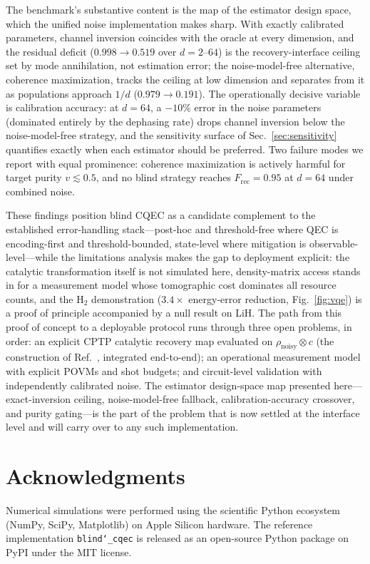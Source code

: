 \documentclass[a4paper,onecolumn]{quantumarticle}
\newcommand{\Frec}{F_\mathrm{rec}}
\newcommand{\rhon}{\rho_\mathrm{noisy}}
\begin{document}
The benchmark's substantive content is the map of the estimator design space, which the unified noise implementation makes sharp.
With exactly calibrated parameters, channel inversion coincides with the oracle at every dimension, and the residual deficit ($0.998 \to 0.519$ over $d = 2$--$64$) is the recovery-interface ceiling set by mode annihilation, not estimation error; the noise-model-free alternative, coherence maximization, tracks the ceiling at low dimension and separates from it as populations approach $1/d$ ($0.979 \to 0.191$).
The operationally decisive variable is calibration accuracy: at $d = 64$, a $-10\%$ error in the noise parameters (dominated entirely by the dephasing rate) drops channel inversion below the noise-model-free strategy, and the sensitivity surface of Sec.~\ref{sec:sensitivity} quantifies exactly when each estimator should be preferred.
Two failure modes we report with equal prominence: coherence maximization is actively harmful for target purity $v \lesssim 0.5$, and no blind strategy reaches $\Frec = 0.95$ at $d = 64$ under combined noise.

These findings position blind CQEC as a candidate complement to the established error-handling stack---post-hoc and threshold-free where QEC is encoding-first and threshold-bounded, state-level where mitigation is observable-level---while the limitations analysis makes the gap to deployment explicit: the catalytic transformation itself is not simulated here, density-matrix access stands in for a measurement model whose tomographic cost dominates all resource counts, and the H$_2$ demonstration ($3.4\times$ energy-error reduction, Fig.~\ref{fig:vqe}) is a proof of principle accompanied by a null result on LiH.
The path from this proof of concept to a deployable protocol runs through three open problems, in order: an explicit CPTP catalytic recovery map evaluated on $\rhon \otimes c$ (the construction of Ref.~\cite{Wakaura2026unified}, integrated end-to-end); an operational measurement model with explicit POVMs and shot budgets; and circuit-level validation with independently calibrated noise.
The estimator design-space map presented here---exact-inversion ceiling, noise-model-free fallback, calibration-accuracy crossover, and purity gating---is the part of the problem that is now settled at the interface level and will carry over to any such implementation.


\section*{Acknowledgments}
Numerical simulations were performed using the scientific Python ecosystem (NumPy, SciPy, Matplotlib) on Apple Silicon hardware.
The reference implementation \texttt{blind\char`\_cqec} is released as an open-source Python package on PyPI under the MIT license.
\end{document}
